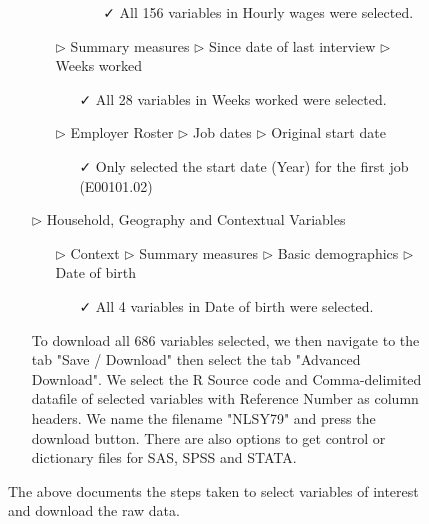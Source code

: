 \documentclass{article}
\begin{document}
\begin{figure}[t]
\begin{tcolorbox}[title = Navigating the data source]
\begin{itemize}
\begin{itemize}
\begin{itemize}
\begin{itemize}
\item[\faCheck] All 156 variables in Hourly wages were selected.
\end{itemize}
\end{itemize}
\end{itemize}
\begin{itemize}
\item[$\triangleright$] Summary measures $\triangleright$ Since date of last interview $\triangleright$ Weeks worked
\begin{itemize}
\item[\faCheck] All 28 variables in Weeks worked were selected.
\end{itemize}
\end{itemize}
\begin{itemize}
\item[$\triangleright$] Employer Roster $\triangleright$ Job dates $\triangleright$ Original start date
\begin{itemize}
\item[\faCheck] Only selected the start date (Year) for the first job (E00101.02)
\end{itemize}
\end{itemize}
\item[$\triangleright$] Household, Geography and Contextual Variables
\begin{itemize}
\item[$\triangleright$] Context $\triangleright$ Summary measures $\triangleright$ Basic demographics $\triangleright$ Date of birth
\begin{itemize}
\item[\faCheck] All 4 variables in Date of birth were selected. 
\end{itemize}
\end{itemize}
\end{itemize}
\begin{itemize}
\item[\faCloudDownload] To download all 686 variables selected, we then navigate to the tab "Save / Download" then select the tab "Advanced Download". We select the R Source code and Comma-delimited datafile of selected variables with Reference Number as column headers. We name the filename "NLSY79" and press the download button. There are also options to get control or dictionary files for SAS, SPSS and STATA. 
\end{itemize}
\end{tcolorbox}
\caption{The above documents the steps taken to select variables of interest and download the raw data.\label{fig:source-nav}}
\end{figure}
\end{document}
